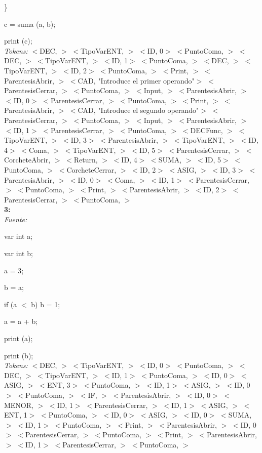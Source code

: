 \documentclass[a4paper, 12pt]{article}
\begin{document}
\}

c = suma (a, b);

print (c);\medskip \\
\emph{Tokens:}
 $<$DEC, $>$ 
 $<$TipoVarENT, $>$ 
 $<$ID, 0$>$ 
 $<$PuntoComa, $>$ 
 $<$DEC, $>$ 
 $<$TipoVarENT, $>$ 
 $<$ID, 1$>$ 
 $<$PuntoComa, $>$ 
 $<$DEC, $>$ 
 $<$TipoVarENT, $>$ 
 $<$ID, 2$>$ 
 $<$PuntoComa, $>$
 $<$Print, $>$ 
 $<$ParentesisAbrir, $>$ 
 $<$CAD, \textnormal{"Introduce el primer operando"}$>$ 
 $<$ParentesisCerrar, $>$ 
 $<$PuntoComa, $>$ 
 $<$Input, $>$ 
 $<$ParentesisAbrir, $>$ 
 $<$ID, 0$>$ 
 $<$ParentesisCerrar, $>$ 
 $<$PuntoComa, $>$ 
 $<$Print, $>$ 
 $<$ParentesisAbrir, $>$ 
 $<$CAD, \textnormal{"Introduce el segundo operando"}$>$ 
 $<$ParentesisCerrar, $>$ 
 $<$PuntoComa, $>$
 $<$Input, $>$ 
 $<$ParentesisAbrir, $>$ 
 $<$ID, 1$>$ 
 $<$ParentesisCerrar, $>$ 
 $<$PuntoComa, $>$ 
 $<$DECFunc, $>$ 
 $<$TipoVarENT, $>$ 
 $<$ID, 3$>$ 
 $<$ParentesisAbrir, $>$ 
 $<$TipoVarENT, $>$
 $<$ID, 4$>$ 
 $<$Coma, $>$ 
 $<$TipoVarENT, $>$ 
 $<$ID, 5$>$ 
 $<$ParentesisCerrar, $>$ 
 $<$CorcheteAbrir, $>$ 
 $<$Return, $>$ 
 $<$ID, 4$>$ 
 $<$SUMA, $>$ 
 $<$ID, 5$>$ 
 $<$PuntoComa, $>$ 
 $<$CorcheteCerrar, $>$ 
 $<$ID, 2$>$ 
 $<$ASIG, $>$ 
 $<$ID, 3$>$ 
 $<$ParentesisAbrir, $>$ 
 $<$ID, 0$>$ 
 $<$Coma, $>$ 
 $<$ID, 1$>$ 
 $<$ParentesisCerrar, $>$ 
 $<$PuntoComa, $>$ 
 $<$Print, $>$ 
 $<$ParentesisAbrir, $>$ 
 $<$ID, 2$>$
 $<$ParentesisCerrar, $>$ 
 $<$PuntoComa, $>$ \bigskip\\
 \textbf{3:}\medskip \\
 \emph{Fuente:}
 
var int a;

var int b;

a = 3;

b = a;

 if (a  $<$  b) b  =  1;
 
 a = a  +  b;
 
print (a);

print (b);\medskip\\
\emph{Tokens:}
 $<$DEC, $>$ 
 $<$TipoVarENT, $>$ 
 $<$ID, 0$>$ 
 $<$PuntoComa, $>$ 
 $<$DEC, $>$ 
 $<$TipoVarENT, $>$ 
 $<$ID, 1$>$ 
 $<$PuntoComa, $>$ 
 $<$ID, 0$>$ 
 $<$ASIG, $>$ 
 $<$ENT, 3$>$ 
 $<$PuntoComa, $>$ 
 $<$ID, 1$>$ 
 $<$ASIG, $>$ 
 $<$ID, 0$>$ 
 $<$PuntoComa, $>$ 
 $<$IF, $>$ 
 $<$ParentesisAbrir, $>$ 
 $<$ID, 0$>$ 
 $<$MENOR, $>$ 
 $<$ID, 1$>$
 $<$ParentesisCerrar, $>$ 
 $<$ID, 1$>$ 
 $<$ASIG, $>$ 
 $<$ENT, 1$>$ 
 $<$PuntoComa, $>$ 
 $<$ID, 0$>$ 
 $<$ASIG, $>$ 
 $<$ID, 0$>$ 
 $<$SUMA, $>$ 
 $<$ID, 1$>$ 
 $<$PuntoComa, $>$ 
 $<$Print, $>$ 
 $<$ParentesisAbrir, $>$ 
 $<$ID, 0$>$ 
 $<$ParentesisCerrar, $>$ 
 $<$PuntoComa, $>$ 
 $<$Print, $>$ 
 $<$ParentesisAbrir, $>$ 
 $<$ID, 1$>$ 
 $<$ParentesisCerrar, $>$ 
 $<$PuntoComa, $>$ 
\end{document}
